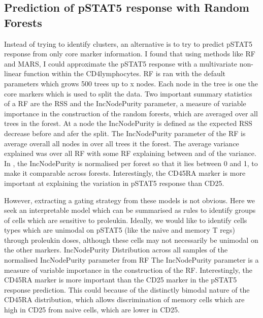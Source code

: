 
\subsection{Prediction of pSTAT5 response with Random Forests} 
Instead of trying to identify clusters, an alternative is to try to predict pSTAT5 response from only core marker information.
I found that using methods like \gls{RF} and \gls{MARS},
I could approximate the pSTAT5 response with a multivariate non-linear function within
the CD4\positive lymphocytes.
\gls{RF} is ran with the default parameters which grows 500 trees up to x nodes.
Each node in the tree is one the core markers which is used to split the data.
Two important summary statistics of a RF are the \gls{RSS} and the IncNodePurity parameter, a measure of variable importance in the
construction of the random forests, which are averaged over all trees in the forest.
At a node the IncNodePurity is defined as the expected \gls{RSS} decrease before and afer the split.
The IncNodePurity parameter of the RF is average overall all nodes in over all trees it the forest.
The average variance explained was  over all \gls{RF} with some \gls{RF} explaining between  and  of the variance.
In , the IncNodePurity is normalised per forest so that it lies between 0 and 1, to make it comparable across forests.
Interestingly, the CD45RA marker is more important at explaining the variation in pSTAT5 response than CD25.

However, extracting a gating strategy from these models is not obvious.
Here we seek an interpretable model which can be summarised as rules to identify groups of cells which are sensitive to proleukin.
Ideally, we would like to identify cells types which are unimodal on pSTAT5 (like the naive and memory T regs) through proleukin doses,
although these cells may not necessarily be unimodal on the other markers.
{IncNodePurity}
{
  Distribution across all samples of the normalised IncNodePurity parameter from \acrfull{RF}
}
{
  The IncNodePurity parameter is a measure of variable importance in the construction of the \acrfull{RF}.
  Interestingly, the CD45RA marker is more important than the CD25 marker in the pSTAT5 response prediction.
  This could because of the distinctly bimodal nature of the CD45RA distribution, which allows discrimination of memory cells which are high in CD25
  from naive cells, which are lower in CD25.
}


